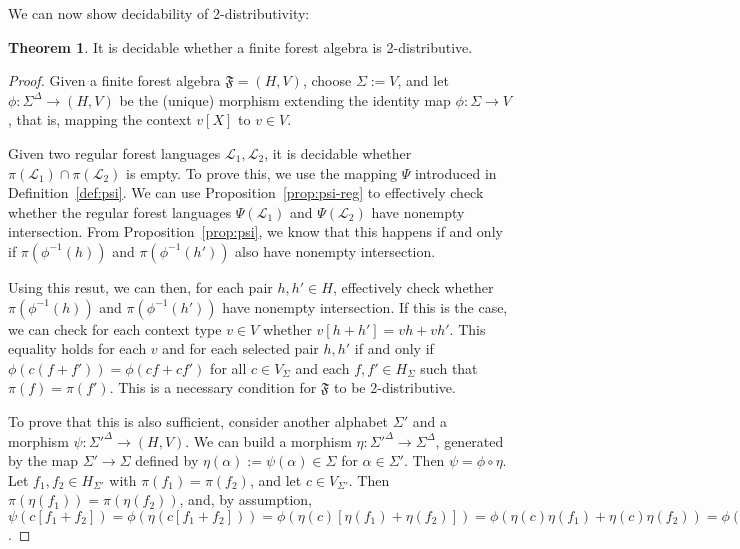 \documentclass[sigplan,9pt]{acmart}\settopmatter{printfolios=true,printccs=false,printacmref=false}
\newcounter{thm}
\newcounter{theorem}
\theoremstyle{definition}
\newtheorem{theorem}[thm]{Theorem}
\newcommand{\La}[0]{{\mathcal{L}}}
\newcommand{\Ff}[0]{{\mathfrak{F}}}
\begin{document}
We can now show decidability of 2-distributivity:
\begin{theorem}\label{prop:2-decid}
It is decidable whether a finite forest algebra is 2-distributive.
\end{theorem}

\begin{proof}
Given a finite forest algebra $\Ff = (H,V)$, choose $\Sigma := V$, and let $\phi : \Sigma^\Delta \rightarrow (H,V)$ be the (unique) morphism extending the identity map $\phi : \Sigma \rightarrow V$, that is, mapping the context $v[X]$ to $v \in V$.

Given two regular forest languages $\La_1, \La_2$, it is decidable whether $\pi(\La_1) \cap \pi(\La_2)$ is empty.
To prove this, we use the mapping $\Psi$ introduced in Definition~\ref{def:psi}.
We can use Proposition~\ref{prop:psi-reg} to effectively check whether the regular forest languages $\Psi(\La_1)$ and $\Psi(\La_2)$ have nonempty intersection.
From Proposition~\ref{prop:psi}, we know that this happens if and only if $\pi(\phi^{-1}(h))$ and $\pi(\phi^{-1}(h'))$ also have nonempty intersection.

Using this resut, we can then, for each pair $h, h' \in H$, effectively check whether $\pi(\phi^{-1}(h))$ and $\pi(\phi^{-1}(h'))$ have nonempty intersection.
If this is the case, we can check for each context type $v \in V$ whether $v[h+h'] = vh+vh'$.
This equality holds for each $v$ and for each selected pair $h, h'$ if and only if $\phi(c(f+f')) = \phi(cf+cf')$ for all $c \in V_\Sigma$ and each $f, f' \in H_\Sigma$ such that $\pi(f) = \pi(f')$.
This is a necessary condition for $\Ff$ to be 2-distributive.


To prove that this is also sufficient, consider another alphabet $\Sigma'$ and a morphism $\psi : \Sigma'^\Delta \rightarrow (H,V)$.
We can build a morphism $\eta : \Sigma'^\Delta \rightarrow \Sigma^\Delta$, generated by the map $\Sigma' \rightarrow \Sigma$ defined by $\eta(\alpha) := \psi(\alpha) \in \Sigma$ for $\alpha \in \Sigma'$.
Then $\psi = \phi \circ \eta$.
Let $f_1, f_2 \in H_{\Sigma'}$ with $\pi(f_1) = \pi(f_2)$, and let $c \in V_{\Sigma'}$.
Then $\pi(\eta(f_1)) = \pi(\eta(f_2))$, and, by assumption, $\psi(c[f_1+f_2]) = \phi(\eta(c[f_1+f_2])) = \phi(\eta(c)[\eta(f_1)+\eta(f_2)]) = \phi(\eta(c)\eta(f_1)+\eta(c)\eta(f_2)) = \phi(\eta(cf_1+cf_2)) = \psi(cf_1+cf_2)$.





\end{proof}
\end{document}

